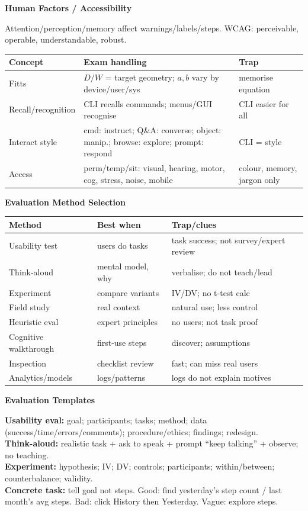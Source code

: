 \documentclass[8pt]{extarticle}
\newcommand{\h}[1]{\vspace{1pt}\textbf{#1}\par}
\begin{document}
\begin{multicols*}{5}
\h{Human Factors / Accessibility}
Attention/perception/memory affect warnings/labels/steps. WCAG: perceivable, operable, understandable, robust.
\begin{tabularx}{\linewidth}{@{}lYY@{}}
\toprule
Concept & Exam handling & Trap\\ \midrule
Fitts & $D/W$ = target geometry; $a,b$ vary by device/user/sys & memorise equation\\
Recall/recognition & CLI recalls commands; menus/GUI recognise & CLI easier for all\\
Interact style & cmd: instruct; Q\&A: converse; object: manip.; browse: explore; prompt: respond & CLI = style\\
Access & perm/temp/sit: visual, hearing, motor, cog, stress, noise, mobile & colour, memory, jargon only\\
\bottomrule
\end{tabularx}

\h{Evaluation Method Selection}
\begin{tabularx}{\linewidth}{@{}lYY@{}}
\toprule
Method & Best when & Trap/clues\\ \midrule
Usability test & users do tasks & task success; not survey/expert review\\
Think-aloud & mental model, why & verbalise; do not teach/lead\\
Experiment & compare variants & IV/DV; no t-test calc\\
Field study & real context & natural use; less control\\
Heuristic eval & expert principles & no users; not task proof\\
Cognitive walkthrough & first-use steps & discover; assumptions\\
Inspection & checklist review & fast; can miss real users\\
Analytics/models & logs/patterns & logs do not explain motives\\
\bottomrule
\end{tabularx}

\h{Evaluation Templates}
\textbf{Usability eval:} goal; participants; tasks; method; data (success/time/errors/comments); procedure/ethics; findings; redesign.\\
\textbf{Think-aloud:} realistic task + ask to speak + prompt ``keep talking'' + observe; no teaching.\\
\textbf{Experiment:} hypothesis; IV; DV; controls; participants; within/between; counterbalance; validity.\\
\textbf{Concrete task:} tell goal not steps. Good: find yesterday's step count / last month's avg steps. Bad: click History then Yesterday. Vague: explore steps.


\end{multicols*}
\end{document}

